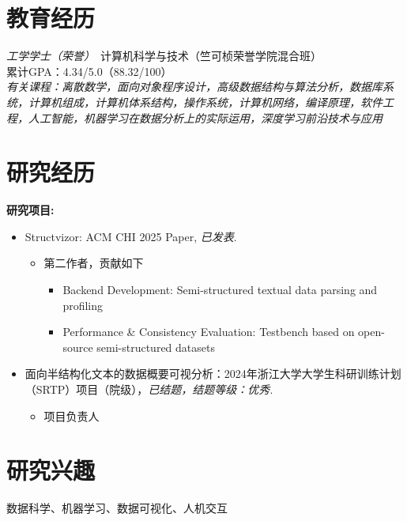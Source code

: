 \documentclass{resume}
\begin{document}


 
\section{教育经历}
\textit{工学学士（荣誉）}\ 计算机科学与技术（竺可桢荣誉学院混合班）\\
累计GPA：4.34/5.0（88.32/100） \\
\textit{有关课程：离散数学，面向对象程序设计，高级数据结构与算法分析，数据库系统，计算机组成，计算机体系结构，操作系统，计算机网络，编译原理，软件工程，人工智能，机器学习在数据分析上的实际运用，深度学习前沿技术与应用}

\section{研究经历}
\role{导师：巫英才，翁荻} 


\textbf{研究项目:}
\begin{itemize}
  \item Structvizor: ACM CHI 2025 Paper, \textit{已发表}.
    \begin{itemize}
        \item 第二作者，贡献如下
        \begin{itemize}
            \item Backend Development: Semi-structured textual data parsing and profiling
            \item Performance \& Consistency Evaluation: Testbench based on open-source semi-structured datasets
        \end{itemize}
    \end{itemize}
  \item 面向半结构化文本的数据概要可视分析：2024年浙江大学大学生科研训练计划（SRTP）项目（院级），\textit{已结题，结题等级：优秀}.
    \begin{itemize}
        \item 项目负责人
    \end{itemize}
\end{itemize}

\section{研究兴趣}
数据科学、机器学习、数据可视化、人机交互
\end{document}
